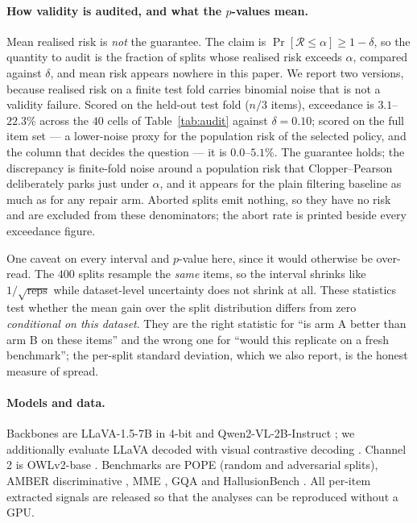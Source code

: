 \documentclass{article}
\theoremstyle{plain}
\theoremstyle{definition}
\theoremstyle{remark}
\newcommand{\Risk}{\mathcal{R}}
\begin{document}
\paragraph{How validity is audited, and what the $p$-values mean.}
Mean realised risk is \emph{not} the guarantee. The claim is
$\Pr[\Risk\le\alpha]\ge1-\delta$, so the quantity to audit is the fraction of splits whose
realised risk exceeds $\alpha$, compared against $\delta$, and mean risk appears nowhere in
this paper. We report two versions, because realised risk on a finite test fold carries
binomial noise that is not a validity failure. Scored on the held-out test fold ($n/3$ items),
exceedance is $3.1$--$22.3\%$ across the $40$ cells of Table~\ref{tab:audit} against
$\delta=0.10$; scored on the full item set --- a lower-noise proxy for the population risk of
the selected policy, and the column that decides the question --- it is $0.0$--$5.1\%$. The
guarantee holds; the discrepancy is finite-fold noise around a population risk that
Clopper--Pearson deliberately parks just under $\alpha$, and it appears for the plain filtering
baseline as much as for any repair arm. Aborted splits emit nothing, so they have no risk and
are excluded from these denominators; the abort rate is printed beside every exceedance figure.

One caveat on every interval and $p$-value here, since it would otherwise be over-read. The
$400$ splits resample the \emph{same} items, so the interval shrinks like
$1/\sqrt{\text{reps}}$ while dataset-level uncertainty does not shrink at all. These statistics
test whether the mean gain over the split distribution differs from zero \emph{conditional on
this dataset}. They are the right statistic for ``is arm A better than arm B on these items''
and the wrong one for ``would this replicate on a fresh benchmark''; the per-split standard
deviation, which we also report, is the honest measure of spread.

\paragraph{Models and data.}
Backbones are LLaVA-1.5-7B \citep{llava} in 4-bit and Qwen2-VL-2B-Instruct \citep{qwenvl};
we additionally evaluate LLaVA decoded with visual contrastive decoding \citep{vcd}.
Channel 2 is OWLv2-base \citep{owlv2}. Benchmarks are POPE \citep{pope} (random and
adversarial splits), AMBER discriminative \citep{amber}, MME \citep{mme}, GQA \citep{gqa}
and HallusionBench \citep{hallusionbench}. All per-item extracted signals are released so
that the analyses can be reproduced without a GPU.
\end{document}
